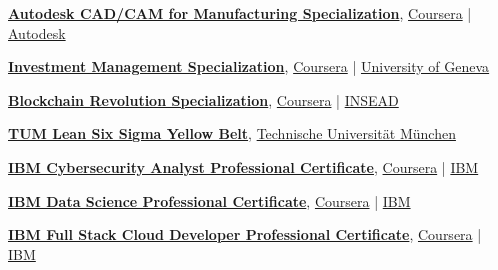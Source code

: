 \documentclass[a4paper,11pt]{article}
\begin{document}
	\vspace{0.1cm}
	
	\href{https://www.coursera.org/account/accomplishments/specialization/certificate/9L9TW82QJL4P}{\textbf{Autodesk CAD/CAM for Manufacturing Specialization}}, \href{https://www.coursera.org/}{Coursera} | \href{https://www.autodesk.com/}{Autodesk}
	
	\vspace{0.1cm}
	
	\href{https://www.coursera.org/account/accomplishments/specialization/certificate/SD9FXPT9TGPW}{\textbf{Investment Management Specialization}}, \href{https://www.coursera.org/}{Coursera} | \href{https://www.unige.ch}{University of Geneva}
	
	\vspace{0.1cm}
	
	\href{https://www.coursera.org/account/accomplishments/specialization/certificate/A8H8JEC9ZS56}{\textbf{Blockchain Revolution Specialization}}, \href{https://www.coursera.org/}{Coursera} | \href{https://www.insead.edu/}{INSEAD}
	
	\vspace{0.1cm}
	
	\href{https://trinhvanvuong.github.io/pdf/TUM_Lean_Six_Sigma_Yellow_Belt_Certificate.pdf}{\textbf{TUM Lean Six Sigma Yellow Belt}}, \href{https://www.tum.de}{Technische Universit\"{a}t M\"{u}nchen}
	
	\vspace{0.1cm}
	
	\href{https://www.coursera.org/account/accomplishments/specialization/certificate/42398B2749UB}{\textbf{IBM Cybersecurity Analyst Professional Certificate}}, \href{https://www.coursera.org/}{Coursera} | \href{https://www.ibm.com/}{IBM}
	
	\vspace{0.1cm}
	
	\href{https://www.coursera.org/account/accomplishments/specialization/certificate/7ZHTFXMUPQ97}{\textbf{IBM Data Science Professional Certificate}}, \href{https://www.coursera.org/}{Coursera} | \href{https://www.ibm.com/}{IBM}
	
	\vspace{0.1cm}
	
	\href{https://www.coursera.org/account/accomplishments/specialization/certificate/J5T7HM3MSLAG}{\textbf{IBM Full Stack Cloud Developer Professional Certificate}}, \href{https://www.coursera.org/}{Coursera} | \href{https://www.ibm.com/}{IBM}
	
\end{document}
